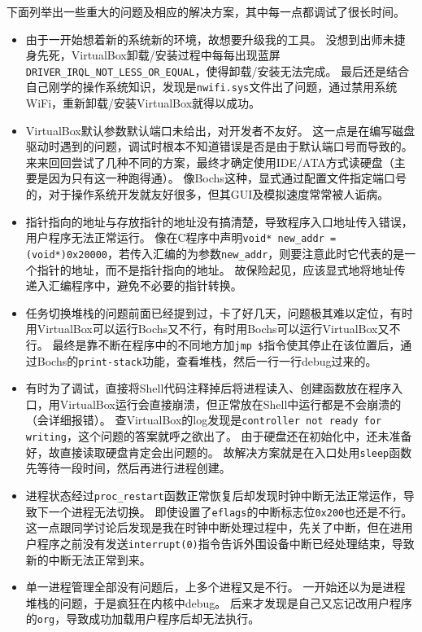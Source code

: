 \documentclass[logo,reportComp]{thesis}
\begin{document}
下面列举出一些重大的问题及相应的解决方案，其中每一点都调试了很长时间。
\begin{itemize}
\item 由于一开始想着新的系统新的环境，故想要升级我的工具。
没想到出师未捷身先死，VirtualBox卸载/安装过程中每每出现蓝屏\verb'DRIVER_IRQL_NOT_LESS_OR_EQUAL'，使得卸载/安装无法完成。
最后还是结合自己刚学的操作系统知识，发现是\verb'nwifi.sys'文件出了问题，通过禁用系统WiFi，重新卸载/安装VirtualBox就得以成功。
\item VirtualBox默认参数默认端口未给出，对开发者不友好。
这一点是在编写磁盘驱动时遇到的问题，调试时根本不知道错误是否是由于默认端口号而导致的。
来来回回尝试了几种不同的方案，最终才确定使用IDE/ATA方式读硬盘（主要是因为只有这一种跑得通）。
像Bochs这种，显式通过配置文件指定端口号的，对于操作系统开发就友好很多，但其GUI及模拟速度常常被人诟病。
\item 指针指向的地址与存放指针的地址没有搞清楚，导致程序入口地址传入错误，用户程序无法正常运行。
像在C程序中声明\verb'void* new_addr = (void*)0x20000'，若传入汇编的为参数\verb'new_addr'，则要注意此时它代表的是一个指针的地址，而不是指针指向的地址。
故保险起见，应该显式地将地址传递入汇编程序中，避免不必要的指针转换。
\item 任务切换堆栈的问题前面已经提到过，卡了好几天，问题极其难以定位，有时用VirtualBox可以运行Bochs又不行，有时用Bochs可以运行VirtualBox又不行。
最终是靠不断在程序中的不同地方加\verb'jmp $'指令使其停止在该位置后，通过Bochs的\verb'print-stack'功能，查看堆栈，然后一行一行debug过来的。
\item 有时为了调试，直接将Shell代码注释掉后将进程读入、创建函数放在程序入口，用VirtualBox运行会直接崩溃，但正常放在Shell中运行都是不会崩溃的（会详细报错）。
查VirtualBox的log发现是\verb'controller not ready for writing'，这个问题的答案就呼之欲出了。
由于硬盘还在初始化中，还未准备好，故直接读取硬盘肯定会出问题的。
故解决方案就是在入口处用\verb'sleep'函数先等待一段时间，然后再进行进程创建。
\item 进程状态经过\verb'proc_restart'函数正常恢复后却发现时钟中断无法正常运作，导致下一个进程无法切换。
即使设置了\verb'eflags'的中断标志位\verb'0x200'也还是不行。
这一点跟同学讨论后发现是我在时钟中断处理过程中，先关了中断，但在进用户程序之前没有发送\verb'interrupt(0)'指令告诉外围设备中断已经处理结束，导致新的中断无法正常到来。
\item 单一进程管理全部没有问题后，上多个进程又是不行。
一开始还以为是进程堆栈的问题，于是疯狂在内核中debug。
后来才发现是自己又忘记改用户程序的\verb'org'，导致成功加载用户程序后却无法执行。
\end{itemize}
\end{document}
